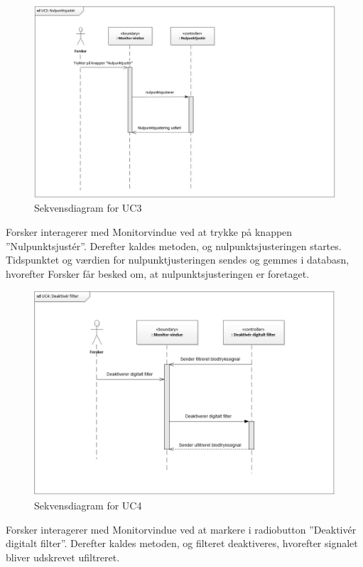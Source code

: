 \begin{figure}[H]
	\centering
	\includegraphics[width=1\textwidth]{Figurer/UC3_SD}
	\caption{Sekvensdiagram for UC3}
\end{figure}

Forsker interagerer med Monitorvindue ved at trykke på knappen ”Nulpunktsjustér”. Derefter kaldes metoden, og nulpunktsjusteringen startes. Tidspunktet og værdien for nulpunktjusteringen sendes og gemmes i databasn, hvorefter Forsker får besked om, at nulpunktsjusteringen er foretaget. 

\begin{figure}[H]
	\centering
	\includegraphics[width=1\textwidth]{Figurer/UC4_SD}
	\caption{Sekvensdiagram for UC4}
\end{figure}

Forsker interagerer med Monitorvindue ved at markere i radiobutton ”Deaktivér digitalt filter”. Derefter kaldes metoden, og filteret deaktiveres, hvorefter signalet bliver udskrevet ufiltreret.


